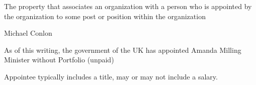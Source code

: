 \documentclass[letterpaper,10pt,english]{sphinxmanual}
\begin{document}
\begin{sphinxShadowBox}

\sphinxAtStartPar
{}
\end{sphinxShadowBox}

\begin{sphinxShadowBox}

\sphinxAtStartPar
The property that associates an organization with a person who is appointed by the organization to some post or position within the organization
\end{sphinxShadowBox}

\begin{sphinxShadowBox}

\sphinxAtStartPar
Michael Conlon 
\end{sphinxShadowBox}

\begin{sphinxShadowBox}

\sphinxAtStartPar
{\hyperref[\detokenize{doc-ORG_0000001::doc}]{}}
\end{sphinxShadowBox}

\begin{sphinxShadowBox}

\sphinxAtStartPar
{\hyperref[\detokenize{doc-NCBITaxon_9606::doc}]{}}
\end{sphinxShadowBox}

\begin{sphinxShadowBox}

\sphinxAtStartPar
{\hyperref[\detokenize{doc-ORG_2000025::doc}]{}}
\end{sphinxShadowBox}

\begin{sphinxShadowBox}

\sphinxAtStartPar
As of this writing, the government of the UK has appointed Amanda Milling Minister without Portfolio (unpaid)
\end{sphinxShadowBox}

\begin{sphinxShadowBox}

\sphinxAtStartPar
Appointee typically includes a title, may or may not include a salary.
\end{sphinxShadowBox}
\end{document}

